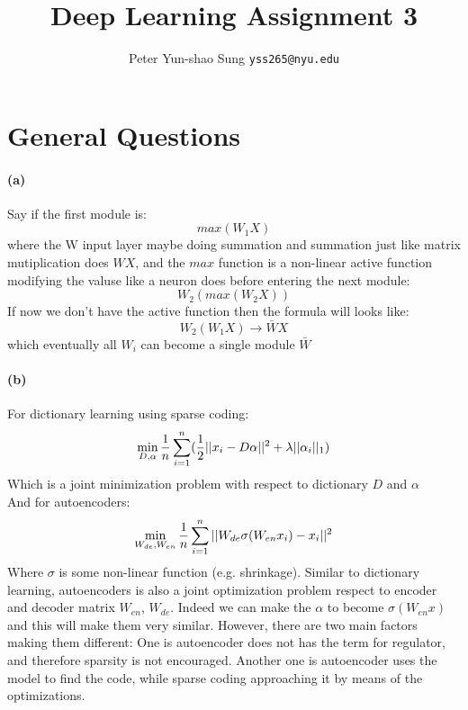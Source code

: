 \documentclass{article}
\title{Deep Learning Assignment 3}
\author{
  Peter Yun-shao Sung
  \texttt{yss265@nyu.edu} \\
}
\begin{document}

\maketitle
\section{General Questions}
\paragraph{(a)} Say if the first module is:
\begin{equation}
max(W_1X)
\end{equation}
where the W input layer maybe doing summation and summation just like matrix mutiplication does $WX$, and the $max$ function is a non-linear active function modifying the valuse like a neuron does before entering the next module:
\begin{equation}
W_2(max(W_2X))
\end{equation}
If now we don't have the active function then the formula will looks like:
\begin{equation}
W_2(W_1X) \to \bar{W}X
\end{equation}
which eventually all $W_i$ can become a single module $\bar{W}$

\paragraph{(b)} For dictionary learning using sparse coding:
\begin{equation}
\min_{D, \alpha} {1\over n} \displaystyle\sum_{i=1}^n({1\over 2}||x_i-D\alpha||^2 + \lambda||\alpha_i||_1)
\end{equation}
Which is a joint minimization problem with respect to dictionary $D$ and $\alpha$\\
And for autoencoders:
\begin{equation}
\min_{W_{de}, W_{en}} {1 \over n} \displaystyle\sum_{i=1}^n||W_{de}\sigma(W_{en}x_i)-x_i||^2 \\
\end{equation}
Where $\sigma$ is some non-linear function (e.g. shrinkage). Similar to dictionary learning, autoencoders is also a joint optimization problem respect to encoder and decoder matrix $W_{en}$, $W_{de}$. Indeed we can make the $\alpha$ to become $\sigma(W_{en}x)$ and this will make them very similar. However, there are two main factors making them different: One is autoencoder does not has the term for regulator, and therefore sparsity is not encouraged. Another one is autoencoder uses the model to find the code, while sparse coding approaching it by means of the optimizations.
\end{document}

